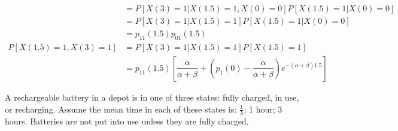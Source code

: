 \documentclass[answers]{exam}
\begin{document}
\begin{questions}
\begin{parts}
\begin{solution}
            \begin{align*}
                                        & = P[X(3) = 1 | X(1.5) = 1, X(0) = 0] P[X(1.5) = 1 | X(0) = 0]                                                                              \\
                                        & = P[X(3) = 1 | X(1.5) = 1]P[X(1.5) = 1 | X(0) = 0]                                                                                         \\
                                        & = p_{11}(1.5) p_{01}(1.5)                                                                                                                  \\
                P[X(1.5) = 1, X(3) = 1] & = P[X(3)=1|X(1.5) = 1]P[X(1.5)=1]                                                                                                          \\
                                        & = p_{11}(1.5)\left[\dfrac{\alpha}{\alpha + \beta} + \left(p_{1}(0) - \dfrac{\alpha}{\alpha + \beta}\right)e ^{-(\alpha + \beta)1.5}\right]
            \end{align*}

        \end{solution}
    \end{parts}


    A rechargeable battery in a depot is in one of three states: fully charged, in
    use, or recharging. Assume the mean time in each of these states is:
    $\frac{1}{\lambda}$; 1 hour; 3 hours. Batteries are not put into use unless
    they are fully charged.

\end{questions}
\end{document}
